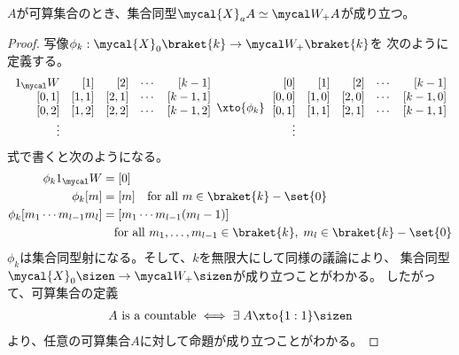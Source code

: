 	\begin{proposition}[数を表す文字列]\label{prop:数を表す文字列} %
		$A$が可算集合のとき、集合同型$\mycal{X}_aA\simeq\Word_+A$が成り立つ。
	\end{proposition} %
	\begin{proof} 写像$\phi_k:\mycal{X}_0\braket{k}\to\Word_+\braket{k}$を
	次のように定義する。
	\begin{equation*}\begin{split}
		\begin{array}{rrrcr}
			\,1_\Word & [1] & [2] & \cdots & [k-1] \\
			\,[0,1] & [1,1] & [2,1] & \cdots & [k-1,1] \\
			\,[0,2] & [1,2] & [2,2] & \cdots & [k-1,2] \\
			\vdots \\
		\end{array} \xto{\phi_k} \begin{array}{rrrcr}
			\,[0] & [1] & [2] & \cdots & [k-1] \\
			\,[0,0] & [1,0] & [2,0] & \cdots & [k-1,0] \\
			\,[0,1] & [1,1] & [2,1] & \cdots & [k-1,1] \\
			\vdots \\
		\end{array}
	\end{split}\end{equation*}
	式で書くと次のようになる。
	\begin{equation*}\begin{split}
		\phi_k1_\Word &= [0] \\
		\phi_k[m] &= [m] \quad\text{for all }m\in\braket{k}-\set{0} \\
		\phi_k[m_1\cdots m_{l-1}m_l] &= [m_1\cdots m_{l-1}(m_l-1)] \\
		&\quad\text{for all }m_1,\dots,m_{l-1}\in\braket{k},\;m_l\in\braket{k}-\set{0} \\
	\end{split}\end{equation*}
	$\phi_k$は集合同型射になる。そして、$k$を無限大にして同様の議論により、
	集合同型$\mycal{X}_0\sizen\to\Word_+\sizen$が成り立つことがわかる。
	したがって、可算集合の定義
	\begin{equation*}\begin{split}
		A \text{ is a countable} \iff \exists\; A\xto{1:1}\sizen
	\end{split}\end{equation*}
	より、任意の可算集合$A$に対して命題が成り立つことがわかる。
	\end{proof}

